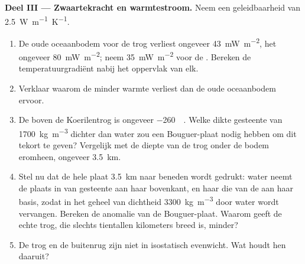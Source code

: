 \begin{problem}
\medskip
\noindent\textbf{Deel III --- Zwaartekracht en warmtestroom.} Neem een geleidbaarheid van \qty{2.5}{W.m^{-1}.K^{-1}}.
\begin{enumerate}[resume]
  \item De oude oceaanbodem voor de trog verliest ongeveer \qty{43}{mW.m^{-2}}, het  ongeveer \qty{80}{mW.m^{-2}}; neem \qty{35}{mW.m^{-2}} voor de . Bereken de temperatuurgradiënt nabij het oppervlak van elk.
  \item Verklaar waarom de  minder warmte verliest dan de oude oceaanbodem ervoor.
  \item De  boven de Koerilentrog is ongeveer \qty{-260}{\milli\gal}. Welke dikte gesteente van \qty{1700}{kg.m^{-3}} dichter dan water zou een Bouguer-plaat nodig hebben om dit tekort te geven? Vergelijk met de diepte van de trog onder de bodem eromheen, ongeveer \qty{3.5}{km}.
  \item Stel nu dat de hele plaat \qty{3.5}{km} naar beneden wordt gedrukt: water neemt de plaats in van gesteente aan haar bovenkant, en haar  die van de  aan haar basis, zodat in het geheel  van dichtheid \qty{3300}{kg.m^{-3}} door water wordt vervangen. Bereken de anomalie van de Bouguer-plaat. Waarom geeft de echte trog, die slechts tientallen kilometers breed is, minder?
  \item De trog en de buitenrug zijn niet in isostatisch evenwicht. Wat houdt hen daaruit?
\end{enumerate}


\end{problem}
